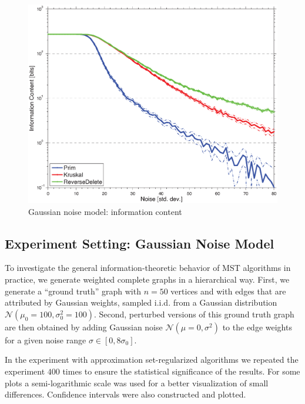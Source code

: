 \begin{figure}[!t]
\centering
\includegraphics[width=.9\textwidth]{figures/ch_mst/gaus_inf_log}
\caption{Gaussian noise model: information content}
\label{fig:gaus_inf}
\end{figure}

\subsection{Experiment Setting: Gaussian Noise Model}
To investigate the general information-theoretic behavior of MST
algorithms in practice, we generate weighted complete graphs in a
hierarchical way. First, we generate a ``ground truth'' graph with
$n = 50$ vertices and with edges that are attributed by Gaussian weights,
sampled i.i.d. from a Gaussian distribution $\mathcal{N}(\mu_0 = 100,
\sigma_0^2 = 100)$.
Second, perturbed versions of this ground truth graph are then obtained by
adding Gaussian noise $\mathcal{N}(\mu = 0, \sigma^2)$ to the edge
weights for a given noise range $\sigma \in [0,  8\sigma_0]$.

In the experiment with approximation set-regularized algorithms we repeated the
experiment $400$ times to ensure the statistical significance of the
results. For some plots a semi-logarithmic scale was used for a better
visualization of small differences. Confidence intervals were also constructed
and plotted.

